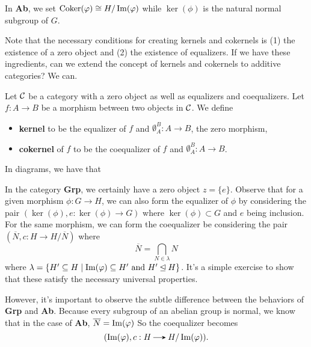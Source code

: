 In \textbf{Ab}, we set $\operatorname{\mathrm{Coker}}(\varphi) \cong H/\operatorname{\rm{Im}}(\varphi)$ while $\ker(\phi)$ is the natural 
normal subgroup of $G$. 

Note that the necessary conditions for creating kernels and cokernels is 
(1) the existence of a zero object and (2) the existence of equalizers.
If we have these ingredients, can we extend the concept of kernels and cokernels to 
additive categories? We can.

\begin{definition}
    Let $\mathcal{C}$ be a category with a zero object as well as equalizers 
    and coequalizers.
    Let $f: A \to B$ be a morphism between two objects in $\mathcal{C}$. We define
    \begin{itemize}
        \item \textbf{kernel} 
        to be the equalizer of $f$ and $\emptyset_A^B: A \to B$, the zero morphism,
        \item  \textbf{cokernel} of $f$
        to be the coequalizer of $f$ and $\emptyset_A^B: A \to B$. 
    \end{itemize}
    In diagrams, we have that 
    \begin{center}
    \end{center}
\end{definition}

\begin{example}
    In the category \textbf{Grp}, we certainly have a zero object $z = \{e\}$.
    Observe that for a given morphism $\phi: G \to H$, 
    we can also form the equalizer of $\phi$ by considering the pair 
    $(\ker(\phi), e: \ker(\phi) \to G)$ where $\ker(\phi) \subset G$ and $e$ being inclusion.
    For the same morphism, we can form the coequalizer be considering the pair 
    $(\overline{N}, c: H \to H/\overline{N})$ where 
    \[
        \overline{N} = \bigcap_{N \in \lambda} N
    \]
    where $\lambda = \{H' \subseteq H \mid \operatorname{\rm{Im}}(\varphi) \subseteq H' \text{ and } H' \unlhd H\}$. 
    It's a simple exercise to show that these satisfy the necessary universal properties. 

    \textcolor{NavyBlue}{However, it's important to observe the subtle difference between the behaviors 
    of \textbf{Grp} and \textbf{Ab}}. Because every subgroup of an abelian group 
    is normal, we know that in the case of \textbf{Ab}, $\overline{N} = \operatorname{\rm{Im}}(\varphi)$
    So the coequalizer becomes 
    \[
        (\im(\phi), c: H \to H/\im(\phi)).
    \]
\end{example}

